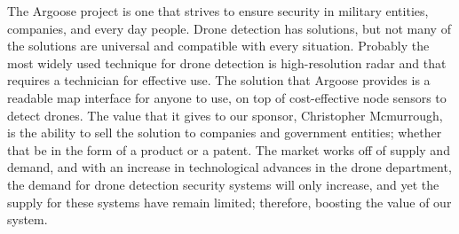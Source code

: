The Argoose project is one that strives to ensure security in military entities, companies, and every day people.  Drone detection has solutions, but not many of the solutions are universal and compatible with every situation.  Probably the most widely used technique for drone detection is high-resolution radar and that requires a technician for effective use.  The solution that Argoose provides is a readable map interface for anyone to use, on top of cost-effective node sensors to detect drones.  The value that it gives to our sponsor, Christopher Mcmurrough, is the ability to sell the solution to companies and government entities; whether that be in the form of a product or a patent.  The market works off of supply and demand, and with an increase in technological advances in the drone department, the demand for drone detection security systems will only increase, and yet the supply for these systems have remain limited; therefore, boosting the value of our system.
